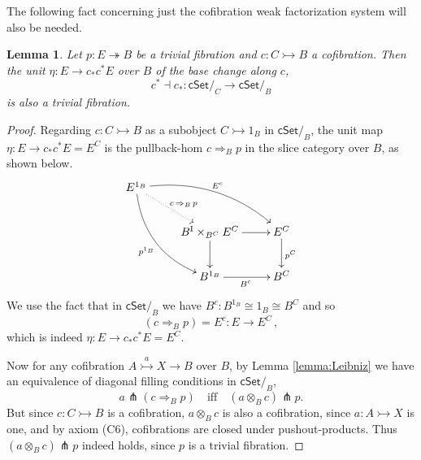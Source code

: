 \documentclass[11pt,reqno]{amsart}
\newcommand{\cSet}{\ensuremath{\mathsf{cSet}}}
\newcommand{\mono}{\ensuremath{\rightarrowtail}}
\newcommand{\ra}{\ensuremath{\rightarrow}}
\newcommand{\cof}{\ensuremath{\rightarrowtail}}
\renewcommand{\to}{\ensuremath{\rightarrow}}
\newcommand{\too}{\ensuremath{\longrightarrow}}
\newcommand{\onto}{\ensuremath{\twoheadrightarrow}}
\newcommand{\I}{\ensuremath{\mathrm{I}}}
\newtheorem{lemma}[theorem]{Lemma}
\theoremstyle{remark}
\theoremstyle{definition}
\begin{document}
The following fact concerning just the cofibration weak factorization system will also be needed.

\begin{lemma}\label{lemma:etaTF}
Let $p: E \onto B$ be a trivial fibration and $c : C\mono B$ a cofibration.  Then the unit $\eta:E \ra c_*c^*E$ over $B$ of the base change along $c$,
\[
c^*\dashv c_* : \cSet/_C \too \cSet/_B
\]
is also a trivial fibration.
\end{lemma}

\begin{proof}
Regarding $c : C \cof B$ as a subobject $C\cof 1_B$ in $\cSet/_B$, the unit map $\eta : E \ra c_*c^*E = E^C$ is the pullback-hom $c\!\Rightarrow_B\! p$ in the slice category over $B$, as shown below.
\begin{equation}\label{diagram:etaispghom}
\xymatrix{
E^{1_B} \ar@/_4ex/ [rdd]_{p^{1_B}} \ar@{.>}[rd]^{c\, \Rightarrow_B\, {p}} \ar@/^4ex/ [rrd]^{E^c} && \\
& B^\I \times_{B^C} E^C \ar[d] \ar[r] & E^C \ar[d]^{p^C} \\
& B^{1_B} \ar[r]_{B^c} &  B^C 
}
\end{equation}
We use the fact that in $\cSet/_B$ we have $B^c : B^{1_B} \cong 1_B \cong B^C$ and so
\[
(c\Rightarrow_B p) = E^c : E \too E^C\,,
\]
which is indeed $\eta : E \ra c_*c^*E = E^C$.

Now for any cofibration $A \stackrel{a}{\cof} X\to B$ over $B$, by Lemma \ref{lemma:Leibniz} we have an equivalence of diagonal filling conditions in $\cSet/_B$,
\[
a \pitchfork (c\!\Rightarrow_B\!p)  \quad\text{iff}\quad (a\!\otimes_B\!c) \pitchfork p.
\]
But since $c : C\mono B$ is a cofibration, $a\otimes_B c$ is also a cofibration, since $a : A \cof X$ is one, and by axiom (C6), cofibrations are closed under pushout-products.  Thus $(a\otimes_B c) \pitchfork p$ indeed holds, since $p$ is a trivial fibration.
\end{proof}
\end{document}
